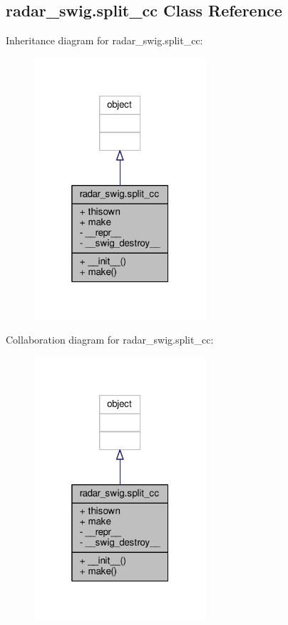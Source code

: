 \subsection{radar\+\_\+swig.\+split\+\_\+cc Class Reference}
\label{classradar__swig_1_1split__cc}


Inheritance diagram for radar\+\_\+swig.\+split\+\_\+cc\+:
\nopagebreak
\begin{figure}[H]
\begin{center}
\leavevmode
\includegraphics[width=181pt]{d7/d6e/classradar__swig_1_1split__cc__inherit__graph}
\end{center}
\end{figure}


Collaboration diagram for radar\+\_\+swig.\+split\+\_\+cc\+:
\nopagebreak
\begin{figure}[H]
\begin{center}
\leavevmode
\includegraphics[width=181pt]{df/df9/classradar__swig_1_1split__cc__coll__graph}
\end{center}
\end{figure}
